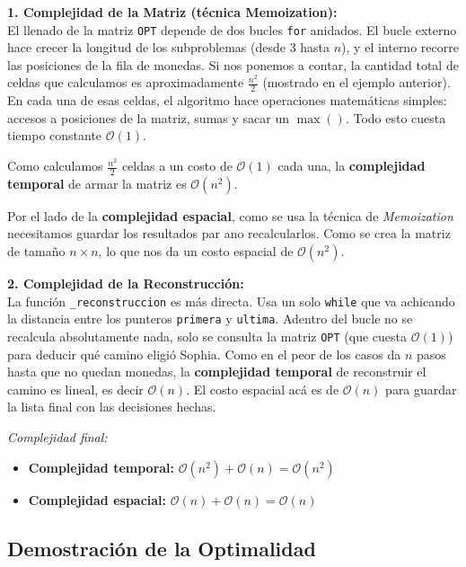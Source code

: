 \noindent\textbf{1. Complejidad de la Matriz (técnica Memoization):}
\\
El llenado de la matriz \texttt{OPT} depende de dos bucles \verb|for| anidados. El bucle externo hace crecer la longitud de los subproblemas (desde $3$ hasta $n$), y el interno recorre las posiciones de la fila de monedas. Si nos ponemos a contar, la cantidad total de celdas que calculamos es aproximadamente $\frac{n^2}{2}$ (mostrado en el ejemplo anterior). En cada una de esas celdas, el algoritmo hace operaciones matemáticas simples: accesos a posiciones de la matriz, sumas y sacar un $\max()$. Todo esto cuesta tiempo constante $\mathcal{O}(1)$.

Como calculamos $\frac{n^2}{2}$ celdas a un costo de $\mathcal{O}(1)$ cada una, la \textbf{complejidad temporal} de armar la matriz es $\mathcal{O}(n^2)$.

Por el lado de la \textbf{complejidad espacial}, como se usa la técnica de \textit{Memoization} necesitamos guardar los resultados par ano recalcularlos. Como se crea la matriz de tamaño $n \times n$, lo que nos da un costo espacial de $\mathcal{O}(n^2)$.

\noindent\textbf{2. Complejidad de la Reconstrucción: }
\\
La función \verb|_reconstruccion| es más directa. Usa un solo \verb|while| que va achicando la distancia entre los punteros \texttt{primera} y \verb|ultima|. 
Adentro del bucle no se recalcula absolutamente nada, solo se consulta la matriz \verb|OPT| (que cuesta $\mathcal{O}(1)$) para deducir qué camino eligió Sophia. Como en el peor de los casos da $n$ pasos hasta que no quedan monedas, la \textbf{complejidad temporal} de reconstruir el camino es lineal, es decir $\mathcal{O}(n)$. El costo espacial acá es de $\mathcal{O}(n)$ para guardar la lista final con las decisiones hechas.

\noindent\textit{Complejidad final: }
\begin{itemize}
    \item \textbf{Complejidad temporal: }$\mathcal{O}(n^2) + \mathcal{O}(n) = \mathcal{O}(n^2)$
    \item \textbf{Complejidad espacial: }$\mathcal{O}(n) + \mathcal{O}(n) = \mathcal{O}(n)$
\end{itemize}


\subsection{Demostración de la Optimalidad}

